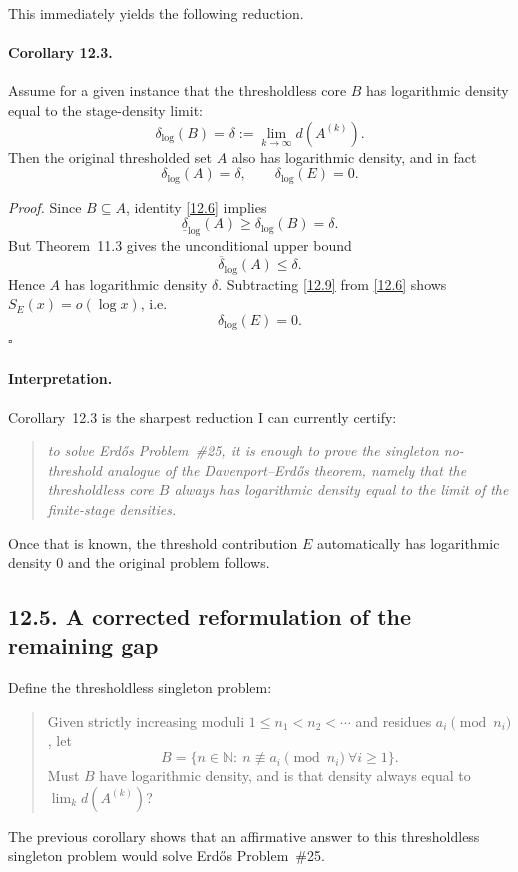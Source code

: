 This immediately yields the following reduction.

\paragraph{Corollary 12.3.}
Assume for a given instance that the thresholdless core $B$ has logarithmic density equal to the stage-density limit:
\begin{equation}
\delta_{\log}(B)=\delta:=\lim_{k\to\infty}d(A^{(k)}).
\tag{12.9}
\end{equation}
Then the original thresholded set $A$ also has logarithmic density, and in fact
\begin{equation}
\delta_{\log}(A)=\delta,
\qquad
\delta_{\log}(E)=0.
\tag{12.10}
\end{equation}

\emph{Proof.}
Since $B\subseteq A$, identity \eqref{12.6} implies
\[
\underline\delta_{\log}(A)\ge \delta_{\log}(B)=\delta.
\]
But Theorem~11.3 gives the unconditional upper bound
\[
\overline\delta_{\log}(A)\le \delta.
\]
Hence $A$ has logarithmic density $\delta$.  Subtracting \eqref{12.9} from \eqref{12.6} shows $S_E(x)=o(\log x)$, i.e.
\[
\delta_{\log}(E)=0.
\]
\hfill $\square$

\paragraph{Interpretation.}
Corollary~12.3 is the sharpest reduction I can currently certify:
\begin{quote}
\emph{to solve Erd\H{o}s Problem~\#25, it is enough to prove the singleton no-threshold analogue of the Davenport--Erd\H{o}s theorem, namely that the thresholdless core $B$ always has logarithmic density equal to the limit of the finite-stage densities.}
\end{quote}
Once that is known, the threshold contribution $E$ automatically has logarithmic density $0$ and the original problem follows.

\subsection*{12.5. A corrected reformulation of the remaining gap}
Define the thresholdless singleton problem:
\begin{quote}
Given strictly increasing moduli $1\le n_1<n_2<\cdots$ and residues $a_i\pmod{n_i}$, let
\[
B=\{n\in\mathbb N:\ n\not\equiv a_i\pmod{n_i}\ \forall i\ge 1\}.
\]
Must $B$ have logarithmic density, and is that density always equal to $\lim_k d(A^{(k)})$?
\end{quote}
The previous corollary shows that an affirmative answer to this thresholdless singleton problem would solve Erd\H{o}s Problem~\#25.

